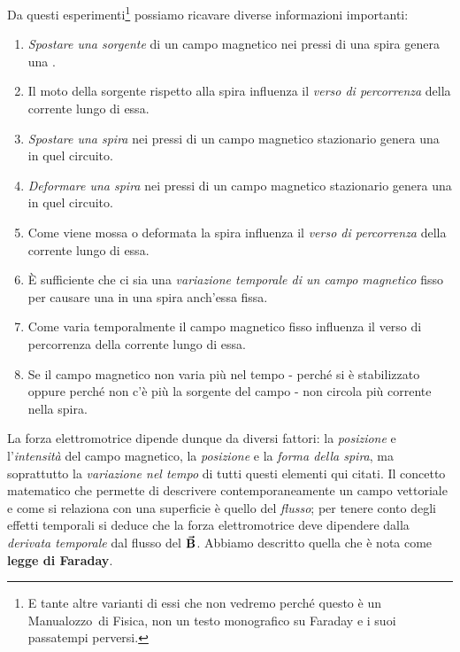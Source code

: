 Da questi esperimenti\footnote{E tante altre varianti di essi che non vedremo perché questo è un Manualozzo\texttrademark\ di Fisica, non un testo monografico su Faraday e i suoi passatempi perversi.} possiamo ricavare diverse informazioni importanti:
\begin{enumerate}[label=\alph*)]\label{osservazioniFaraday} %
	\item \textit{Spostare una sorgente} di un campo magnetico nei pressi di una spira genera una \fem.
	\item Il moto della sorgente rispetto alla spira influenza il \textit{verso di percorrenza} della corrente lungo di essa.
	\item \textit{Spostare una spira} nei pressi di un campo magnetico stazionario genera una \fem in quel circuito.
	\item \textit{Deformare una spira} nei pressi di un campo magnetico stazionario genera una \fem in quel circuito.
	\item Come viene mossa o deformata la spira influenza il \textit{verso di percorrenza} della corrente lungo di essa.
	\item È sufficiente che ci sia una \textit{variazione temporale di un campo magnetico} fisso per causare una \fem in una spira anch'essa fissa.
	\item Come varia temporalmente il campo magnetico fisso influenza il verso di percorrenza della corrente lungo di essa.
	\item Se il campo magnetico non varia più nel tempo - perché si è stabilizzato oppure perché non c'è più la sorgente del campo - non circola più corrente nella spira.
\end{enumerate}
La forza elettromotrice dipende dunque da diversi fattori: la \textit{posizione} e l'\textit{intensità} del campo magnetico, la \textit{posizione} e la \textit{forma della spira}, ma soprattutto la \textit{variazione nel tempo} di tutti questi elementi qui citati.
Il concetto matematico che permette di descrivere contemporaneamente un campo vettoriale e come si relaziona con una superficie è quello del \textit{flusso}; per tenere conto degli effetti temporali si deduce che la forza elettromotrice deve dipendere dalla \textit{derivata temporale} dal flusso del $\vb*{\va{B}}$. Abbiamo descritto quella che è nota come \textbf{legge di Faraday}.
